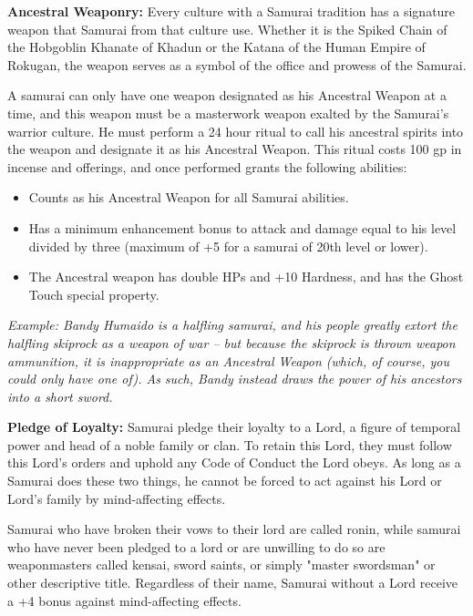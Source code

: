 \documentclass[10pt]{article}
\newcommand{\ability}[2]{\smallskip \noindent \textbf{#1} #2}
\newcommand{\example}[1]{\emph{#1}}
\newcommand{\itemspace}[0]{\setlength{\itemsep}{-1mm}}
\begin{document}
\ability{Ancestral Weaponry:}{Every culture with a Samurai tradition has a signature weapon that Samurai from that culture use. Whether it is the Spiked Chain of the Hobgoblin Khanate of Khadun or the Katana of the Human Empire of Rokugan, the weapon serves as a symbol of the office and prowess of the Samurai. \smallskip

A samurai can only have one weapon designated as his Ancestral Weapon at a time, and this weapon must be a masterwork weapon exalted by the Samurai's warrior culture. He must perform a 24 hour ritual to call his ancestral spirits into the weapon and designate it as his Ancestral Weapon. This ritual costs 100 gp in incense and offerings, and once performed grants the following abilities:}

\begin{itemize}\itemspace
    \item Counts as his Ancestral Weapon for all Samurai abilities.
    \item Has a minimum enhancement bonus to attack and damage equal to his level divided by three (maximum of +5 for a samurai of 20th level or lower).
    \item The Ancestral weapon has double HPs and +10 Hardness, and has the Ghost Touch special property.
\end{itemize}

\example{Example: Bandy Humaido is a halfling samurai, and his people greatly extort the halfling skiprock as a weapon of war -- but because the skiprock is thrown weapon ammunition, it is inappropriate as an Ancestral Weapon (which, of course, you could only have one of). As such, Bandy instead draws the power of his ancestors into a short sword.}

\ability{Pledge of Loyalty:}{Samurai pledge their loyalty to a Lord, a figure of temporal power and head of a noble family or clan. To retain this Lord, they must follow this Lord's orders and uphold any Code of Conduct the Lord obeys. As long as a Samurai does these two things, he cannot be forced to act against his Lord or Lord's family by mind-affecting effects.\smallskip

Samurai who have broken their vows to their lord are called ronin, while samurai who have never been pledged to a lord or are unwilling to do so are weaponmasters called kensai, sword saints, or simply "master swordsman" or other descriptive title. Regardless of their name, Samurai without a Lord receive a +4 bonus against mind-affecting effects.}
\end{document}
